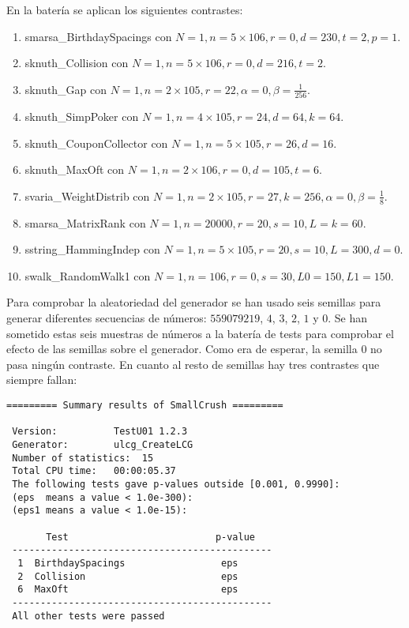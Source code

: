 \documentclass{article}
\begin{document}
En la batería se aplican los siguientes contrastes:

\begin{enumerate}
    \item smarsa\_BirthdaySpacings con $N = 1, n = 5 \times 106, r = 0, d = 230, t = 2, p = 1$.
    \item sknuth\_Collision con $N = 1, n = 5 \times 106, r = 0, d = 216, t = 2$.
    \item sknuth\_Gap con $N = 1, n = 2 \times 105, r = 22, \alpha = 0, \beta = \frac{1}{256}$.
    \item sknuth\_SimpPoker con $N = 1, n = 4 \times 105, r = 24, d = 64, k = 64$.
    \item sknuth\_CouponCollector con $N = 1, n = 5 \times 105, r = 26, d = 16$.
    \item sknuth\_MaxOft con $N = 1, n = 2 \times 106, r = 0, d = 105, t = 6$.
    \item svaria\_WeightDistrib con $N = 1, n = 2 \times 105, r = 27, k = 256, \alpha = 0, \beta= \frac{1}{8}$.
    \item smarsa\_MatrixRank con $N = 1, n = 20000, r = 20, s = 10, L = k = 60$.
    \item sstring\_HammingIndep con $N = 1, n = 5 \times 105, r = 20, s = 10, L = 300, d = 0$.
    \item swalk\_RandomWalk1 con $N = 1, n = 106, r = 0, s = 30, L0 = 150, L1 = 150$.
\end{enumerate}

Para comprobar la aleatoriedad del generador se han usado seis semillas para generar diferentes secuencias de números: $559079219$, $4$, $3$, $2$, $1$ y $0$. 
Se han sometido estas seis muestras de números a la batería de tests para comprobar el efecto de las semillas sobre el generador.
Como era de esperar, la semilla $0$ no pasa ningún contraste. En cuanto al resto de semillas hay tres contrastes que siempre fallan:

\begin{lstlisting}
========= Summary results of SmallCrush =========

 Version:          TestU01 1.2.3
 Generator:        ulcg_CreateLCG
 Number of statistics:  15
 Total CPU time:   00:00:05.37
 The following tests gave p-values outside [0.001, 0.9990]:
 (eps  means a value < 1.0e-300):
 (eps1 means a value < 1.0e-15):

       Test                          p-value
 ----------------------------------------------
  1  BirthdaySpacings                 eps  
  2  Collision                        eps  
  6  MaxOft                           eps  
 ----------------------------------------------
 All other tests were passed
\end{lstlisting}
\end{document}
